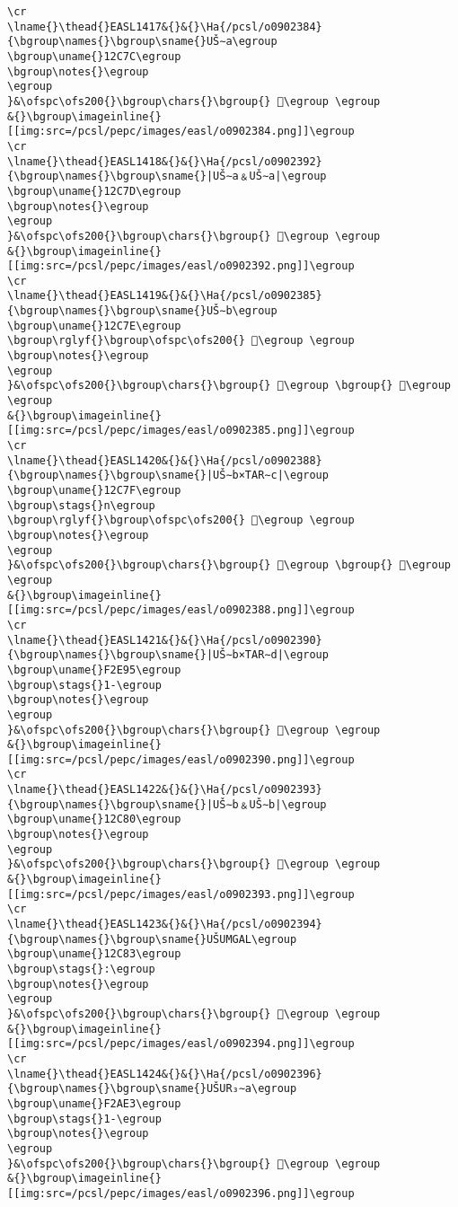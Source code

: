 \begin{verbatim}
\cr
\lname{}\thead{}EASL1417&{}&{}\Ha{/pcsl/o0902384}{\bgroup\names{}\bgroup\sname{}UŠ∼a\egroup
\bgroup\uname{}12C7C\egroup
\bgroup\notes{}\egroup
\egroup
}&\ofspc\ofs200{}\bgroup\chars{}\bgroup{} 𒱼\egroup \egroup
&{}\bgroup\imageinline{}[[img:src=/pcsl/pepc/images/easl/o0902384.png]]\egroup
\cr
\lname{}\thead{}EASL1418&{}&{}\Ha{/pcsl/o0902392}{\bgroup\names{}\bgroup\sname{}|UŠ∼a﹠UŠ∼a|\egroup
\bgroup\uname{}12C7D\egroup
\bgroup\notes{}\egroup
\egroup
}&\ofspc\ofs200{}\bgroup\chars{}\bgroup{} 𒱽\egroup \egroup
&{}\bgroup\imageinline{}[[img:src=/pcsl/pepc/images/easl/o0902392.png]]\egroup
\cr
\lname{}\thead{}EASL1419&{}&{}\Ha{/pcsl/o0902385}{\bgroup\names{}\bgroup\sname{}UŠ∼b\egroup
\bgroup\uname{}12C7E\egroup
\bgroup\rglyf{}\bgroup\ofspc\ofs200{} 𒱾\egroup \egroup
\bgroup\notes{}\egroup
\egroup
}&\ofspc\ofs200{}\bgroup\chars{}\bgroup{} 𒱾\egroup \bgroup{} 𒲁\egroup \egroup
&{}\bgroup\imageinline{}[[img:src=/pcsl/pepc/images/easl/o0902385.png]]\egroup
\cr
\lname{}\thead{}EASL1420&{}&{}\Ha{/pcsl/o0902388}{\bgroup\names{}\bgroup\sname{}|UŠ∼b×TAR∼c|\egroup
\bgroup\uname{}12C7F\egroup
\bgroup\stags{}n\egroup
\bgroup\rglyf{}\bgroup\ofspc\ofs200{} 𒱿\egroup \egroup
\bgroup\notes{}\egroup
\egroup
}&\ofspc\ofs200{}\bgroup\chars{}\bgroup{} 𒲂\egroup \bgroup{} 𒱿\egroup \egroup
&{}\bgroup\imageinline{}[[img:src=/pcsl/pepc/images/easl/o0902388.png]]\egroup
\cr
\lname{}\thead{}EASL1421&{}&{}\Ha{/pcsl/o0902390}{\bgroup\names{}\bgroup\sname{}|UŠ∼b×TAR∼d|\egroup
\bgroup\uname{}F2E95\egroup
\bgroup\stags{}1-\egroup
\bgroup\notes{}\egroup
\egroup
}&\ofspc\ofs200{}\bgroup\chars{}\bgroup{} 󲺕\egroup \egroup
&{}\bgroup\imageinline{}[[img:src=/pcsl/pepc/images/easl/o0902390.png]]\egroup
\cr
\lname{}\thead{}EASL1422&{}&{}\Ha{/pcsl/o0902393}{\bgroup\names{}\bgroup\sname{}|UŠ∼b﹠UŠ∼b|\egroup
\bgroup\uname{}12C80\egroup
\bgroup\notes{}\egroup
\egroup
}&\ofspc\ofs200{}\bgroup\chars{}\bgroup{} 𒲀\egroup \egroup
&{}\bgroup\imageinline{}[[img:src=/pcsl/pepc/images/easl/o0902393.png]]\egroup
\cr
\lname{}\thead{}EASL1423&{}&{}\Ha{/pcsl/o0902394}{\bgroup\names{}\bgroup\sname{}UŠUMGAL\egroup
\bgroup\uname{}12C83\egroup
\bgroup\stags{}:\egroup
\bgroup\notes{}\egroup
\egroup
}&\ofspc\ofs200{}\bgroup\chars{}\bgroup{} 𒲃\egroup \egroup
&{}\bgroup\imageinline{}[[img:src=/pcsl/pepc/images/easl/o0902394.png]]\egroup
\cr
\lname{}\thead{}EASL1424&{}&{}\Ha{/pcsl/o0902396}{\bgroup\names{}\bgroup\sname{}UŠUR₃∼a\egroup
\bgroup\uname{}F2AE3\egroup
\bgroup\stags{}1-\egroup
\bgroup\notes{}\egroup
\egroup
}&\ofspc\ofs200{}\bgroup\chars{}\bgroup{} 󲫣\egroup \egroup
&{}\bgroup\imageinline{}[[img:src=/pcsl/pepc/images/easl/o0902396.png]]\egroup

\end{verbatim}
